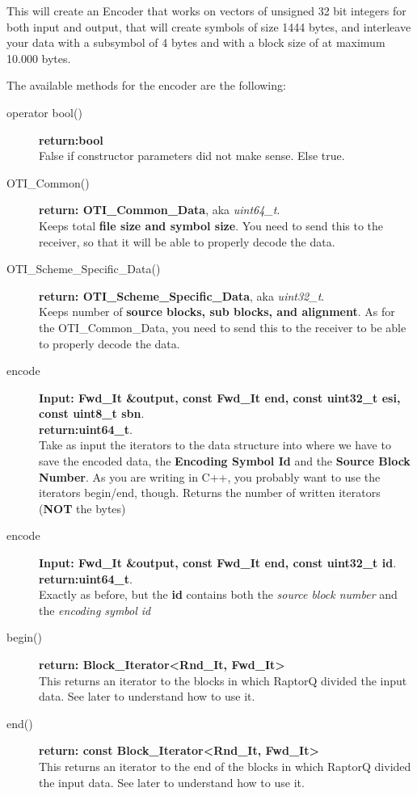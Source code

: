 \documentclass[11pt,a4paper]{refart}
\begin{document}
This will create an Encoder that works on vectors of unsigned 32 bit integers for both input and output, that will create symbols of size 1444 bytes, and interleave your data with a subsymbol of 4 bytes and with a block size of at maximum 10.000 bytes.

The available methods for the encoder are the following:

\begin{description}
\item[operator bool()] \textbf{return:bool}\\
False if constructor parameters did not make sense. Else true.

\item[OTI\_Common()] \textbf{return: OTI\_Common\_Data}, aka \textit{uint64\_t}.\\
Keeps total \textbf{file size and symbol size}. You need to send this to the receiver, so that it will be able to properly decode the data.

\item[OTI\_Scheme\_Specific\_Data()] \textbf{return: OTI\_Scheme\_Specific\_Data}, aka \textit{uint32\_t}.\\
Keeps number of \textbf{source blocks, sub blocks, and alignment}. As for the OTI\_Common\_Data, you need to send this to the receiver to be able to
properly decode the data.

\item[encode] \textbf{Input: Fwd\_It \&output, const Fwd\_It end, const uint32\_t esi, const uint8\_t sbn}.\\
\textbf{return:uint64\_t}.\\
Take as input the iterators to the data structure into where we have to save the encoded data, the \textbf{Encoding Symbol Id} and the
\textbf{Source Block Number}. As you are writing in C++, you probably want to use the iterators begin/end, though. Returns the number of written
iterators (\textbf{NOT} the bytes)

\item[encode] \textbf{Input: Fwd\_It \&output, const Fwd\_It end, const uint32\_t id}.\\
\textbf{return:uint64\_t}.\\
Exactly as before, but the \textbf{id} contains both the \textit{source block number} and the \textit{encoding symbol id}

\item[begin()] \textbf{return: Block\_Iterator<Rnd\_It, Fwd\_It>}\\
This returns an iterator to the blocks in which RaptorQ divided the input data. See later to understand how to use it.
\item[end()] \textbf{return: const Block\_Iterator<Rnd\_It, Fwd\_It>}\\
This returns an iterator to the end of the blocks in which RaptorQ divided the input data. See later to understand how to use it.


\end{description}
\end{document}
